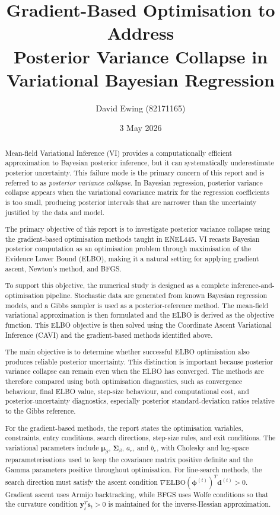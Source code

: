 \documentclass[11pt,a4paper]{article}
\title{
Gradient-Based Optimisation to Address\\
Posterior Variance Collapse in\\
Variational Bayesian Regression
}
\author{
  David Ewing (82171165)\\
}
\date{3 May 2026}
\newcommand{\ELBO}{\text{ELBO}}
\begin{document}
\maketitle

\begin{abstract}
\setlength{\parindent}{0pt}
\setlength{\parskip}{0.7em}


\setlength{\parindent}{0pt}
\setlength{\parskip}{0.7em}

Mean-field Variational Inference (VI) provides a computationally efficient approximation to Bayesian posterior inference, but it can systematically underestimate posterior uncertainty. This failure mode is the primary concern of this report and is referred to as \emph{posterior variance collapse}. In Bayesian regression, posterior variance collapse appears when the variational covariance matrix for the regression coefficients is too small, producing posterior intervals that are narrower than the uncertainty justified by the data and model.

The primary objective of this report is to investigate posterior variance collapse using the gradient-based optimisation methods taught in ENEL445.
 VI recasts Bayesian posterior computation as an optimisation problem through maximisation of the Evidence Lower Bound (ELBO), 
 making it a natural setting for applying gradient ascent, Newton's method, and BFGS. 

To support this objective, the numerical study is designed as a complete inference-and-optimisation pipeline. 
Stochastic data are generated from known Bayesian regression models, and a Gibbs sampler is used as a posterior-reference method. 
The mean-field variational approximation is then formulated and the ELBO is derived as the objective function. 
This ELBO objective is then solved using the 
 Coordinate Ascent Variational Inference (CAVI)   and the  gradient-based methods identified above.

The main objective is to determine whether successful ELBO optimisation also produces reliable posterior uncertainty. This distinction is important because posterior variance collapse can remain even when the ELBO has converged. The methods are therefore compared using both optimisation diagnostics, such as convergence behaviour, final ELBO value, step-size behaviour, and computational cost, and posterior-uncertainty diagnostics, especially posterior standard-deviation ratios relative to the Gibbs reference.

For the gradient-based methods, the report states the optimisation variables, constraints, entry conditions, search directions, step-size rules, and exit conditions. The variational parameters include $\bm{\mu}_\beta$, $\bm{\Sigma}_\beta$, $a_e$, and $b_e$, with Cholesky and log-space reparameterisations used to keep the covariance matrix positive definite and the Gamma parameters positive throughout optimisation. For line-search methods, the search direction must satisfy the ascent condition $\nabla\ELBO(\bm{\phi}^{(t)})^T\bm{d}^{(t)} > 0$. Gradient ascent uses Armijo backtracking, while BFGS uses Wolfe conditions so that the curvature condition $\bm{y}_t^T\bm{s}_t>0$ is maintained for the inverse-Hessian approximation.


\end{abstract}
\end{document}
